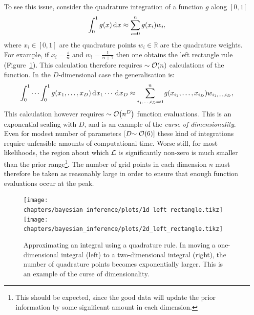 To see this issue, consider the quadrature integration of a function \(g\) along \([0,1]\)
\begin{equation}
  \int_0^1 g(x) \operatorname{d}^{}\!{x} \approx \sum\limits_{i=0}^{n} g(x_i) w_i,
  \label{eqn:bay:quadrature_1d}
\end{equation}
where \({x_i\in[0,1]}\) are the quadrature points \({w_i\in\mathbb{R}}\) are the quadrature weights. For example, if \(x_i = \frac{i}{n}\) and \(w_i=\frac{1}{n+1}\) then one obtains the left rectangle rule (Figure~\ref{fig:bay:quadrature}). This calculation therefore requires \({\sim\mathcal{O}{\left(n\right)}}\) calculations of the function. In the \(D\)-dimensional case the generalisation is:
\begin{equation}
  \int_0^1\cdots\int_0^1 g(x_1,\ldots,x_D) \operatorname{d}^{}\!{x_1}\cdots \: \operatorname{d}^{}\!{x_D} \approx \sum\limits_{i_1,\ldots,i_D=0}^{n} g(x_{i_1},\ldots,x_{i_D}) w_{i_1,\ldots,i_D},
  \label{eqn:bay:quadrature_nd}
\end{equation}
This calculation however requires \({\sim\mathcal{O}{\left(n^D\right)}}\) function evaluations. This is an exponential scaling with \(D\), and is an example of the {\em curse of dimensionality}. Even for modest number of parameters \(\left[ D{\sim\mathcal{O}{\left(6\right)}} \right]\) these kind of integrations require unfeasible amounts of computational time. Worse still, for most likelihoods, the region about which \(\mathcal{L}\) is significantly non-zero is much smaller than the prior range\footnote{This should be expected, since the good data will update the prior information by some significant amount in each dimension.}. The number of grid points in each dimension \(n\) must therefore be taken as reasonably large in order to ensure that enough function evaluations occur at the peak.

\begin{figure}[tp]
  \centering
    \texttt{[image: chapters/bayesian\_inference/plots/1d\_left\_rectangle.tikz]}
    \texttt{[image: chapters/bayesian\_inference/plots/2d\_left\_rectangle.tikz]}
  \caption{Approximating an integral using a quadrature rule. In moving a one-dimensional integral (left) to a two-dimensional integral (right), the number of quadrature points becomes exponentially larger. This is an example of the curse of dimensionality.}\label{fig:bay:quadrature}
\end{figure}

